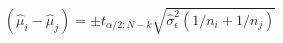 

\[
(\hat{\mu}_i - \hat{\mu}_j) = \pm t_{\alpha/2;N-k}\sqrt{\hat{\sigma}_{\epsilon}^{2}(1/n_i + 1/n_j)}
\]


